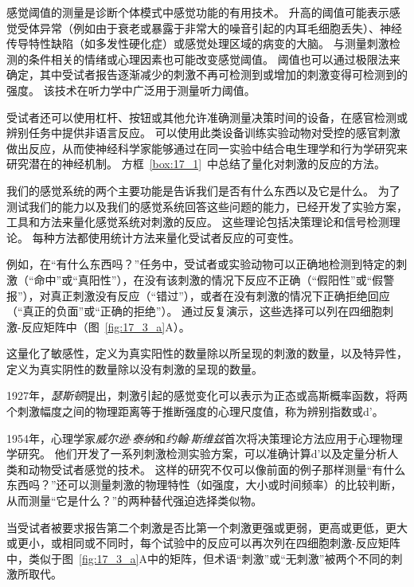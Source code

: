 感觉阈值的测量是诊断个体模式中感觉功能的有用技术。 
升高的阈值可能表示感觉受体异常（例如由于衰老或暴露于非常大的噪音引起的内耳毛细胞丢失）、神经传导特性缺陷（如多发性硬化症）或感觉处理区域的病变的大脑。
与测量刺激检测的条件相关的情绪或心理因素也可能改变感觉阈值。
阈值也可以通过极限法来确定，其中受试者报告逐渐减少的刺激不再可检测到或增加的刺激变得可检测到的强度。
该技术在听力学中广泛用于测量听力阈值。


受试者还可以使用杠杆、按钮或其他允许准确测量决策时间的设备，在感官检测或辨别任务中提供非语言反应。 
可以使用此类设备训练实验动物对受控的感官刺激做出反应，从而使神经科学家能够通过在同一实验中结合电生理学和行为学研究来研究潜在的神经机制。
方框~\ref{box:17_1}~中总结了量化对刺激的反应的方法。


\begin{proposition} \label{box:17_1}
	
	\quad \quad 我们的感觉系统的两个主要功能是告诉我们是否有什么东西以及它是什么。
	为了测试我们的能力以及我们的感觉系统回答这些问题的能力，已经开发了实验方案，工具和方法来量化感觉系统对刺激的反应。
	这些理论包括决策理论和信号检测理论。
	每种方法都使用统计方法来量化受试者反应的可变性。
	
	\quad \quad 例如，在“有什么东西吗？”任务中，受试者或实验动物可以正确地检测到特定的刺激（“命中”或“真阳性”），在没有该刺激的情况下反应不正确（“假阳性”或“假警报”），对真正刺激没有反应（“错过”），或者在没有刺激的情况下正确拒绝回应（“真正的负面”或“正确的拒绝”）。
	通过反复演示，这些选择可以列在四细胞刺激-反应矩阵中（图~\ref{fig:17_3_a}A）。
	
	\quad \quad 这量化了敏感性，定义为真实阳性的数量除以所呈现的刺激的数量，以及特异性，定义为真实阴性的数量除以没有刺激的呈现的数量。
	
	\quad \quad 1927年，\textit{瑟斯顿}提出，刺激引起的感觉变化可以表示为正态或高斯概率函数，将两个刺激幅度之间的物理距离等于推断强度的心理尺度值，称为辨别指数或d'。
	
	\quad \quad 1954年，心理学家\textit{威尔逊$\cdot$泰纳}和\textit{约翰$\cdot$斯维兹}首次将决策理论方法应用于心理物理学研究。
	他们开发了一系列刺激检测实验方案，可以准确计算d'以及定量分析人类和动物受试者感觉的技术。
	这样的研究不仅可以像前面的例子那样测量“有什么东西吗？”还可以测量刺激的物理特性（如强度，大小或时间频率）的比较判断，从而测量“它是什么？”的两种替代强迫选择类似物。
	
	\quad \quad 当受试者被要求报告第二个刺激是否比第一个刺激更强或更弱，更高或更低，更大或更小，或相同或不同时，每个试验中的反应可以再次列在四细胞刺激-反应矩阵中，类似于图~\ref{fig:17_3_a}A中的矩阵，但术语“刺激”或“无刺激”被两个不同的刺激所取代。
	

\end{proposition}
